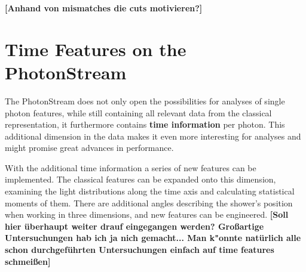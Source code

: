 %
\textbf{[Anhand von mismatches die cuts motivieren?]}

\section{Time Features on the PhotonStream}
%
The PhotonStream does not only open the possibilities for analyses of single
photon features, while still containing all relevant data from the classical
representation, it furthermore contains \textbf{time information} per photon.
This additional dimension in the data makes it even more interesting for
analyses and might promise great advances in performance.

With the additional time information a series of new features can be
implemented. The classical features can be expanded onto this dimension,
examining the light distributions along the time axis and calculating
statistical moments of them. There are additional angles describing the
shower's position when working in three dimensions, and new features can be
engineered. \textbf{[Soll hier überhaupt weiter drauf eingegangen werden? Großartige Untersuchungen hab ich ja nich gemacht... Man k"onnte natürlich alle schon durchgeführten Untersuchungen einfach auf time features schmeißen]}
%
